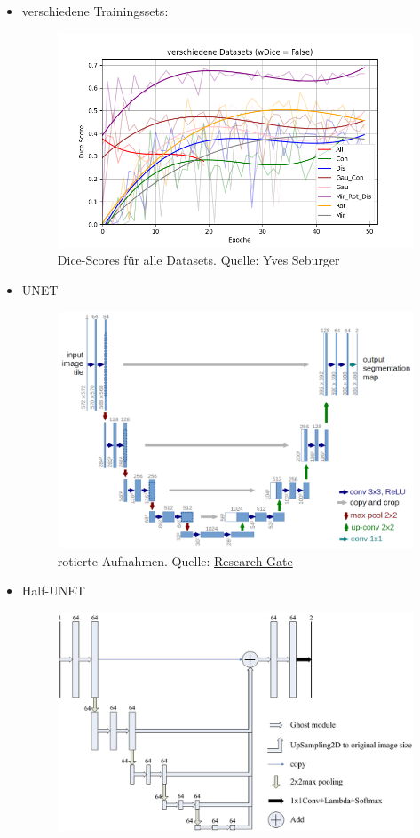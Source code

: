\documentclass{beamer}
\begin{document}
\begin{frame}[allowframebreaks]
\begin{itemize}
    \framebreak
    \item verschiedene Trainingssets:
    \begin{figure}
        \includegraphics[width=0.85\linewidth]{Bilder/alle_Sets_false_trans.png}
        \caption{Dice-Scores für alle Datasets. \scriptsize{Quelle: Yves Seburger}}
    \end{figure}
    \framebreak
    \item UNET
    \begin{figure}
        \includegraphics[width=0.8\linewidth]{Bilder/UNET_transparent.png}
        \caption{rotierte Aufnahmen. Quelle: \href{https://www.researchgate.net/profile/Blaz-Meden/publication/327635322/figure/fig2/AS:672158246252545@1537266422125/Illustration-of-the-training-data-The-top-row-shows-sample-images-from-the-CASIA.ppm}{Research Gate}}
    \end{figure}
    \framebreak
    \item Half-UNET
    \begin{figure}
        \includegraphics[width=0.8\linewidth]{Bilder/halfUNET.png}

\end{figure}
\end{itemize}
\end{frame}
\end{document}
